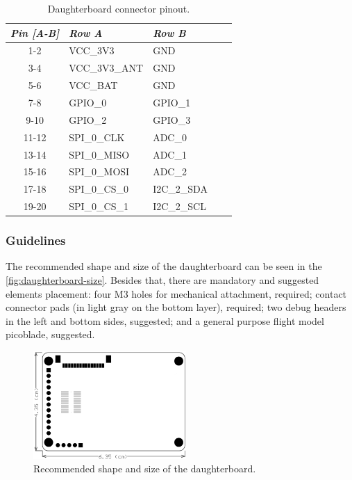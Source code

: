 \begin{table}[!h]
    \centering
    \begin{tabular}{cllll}
        \toprule[1.5pt]
        \textit{Pin [A-B]} & \textit{Row A} & \textit{Row B} \\
        \midrule
        1-2                & VCC\_3V3       & GND            \\
        3-4                & VCC\_3V3\_ANT  & GND            \\
        5-6                & VCC\_BAT       & GND            \\
        7-8                & GPIO\_0        & GPIO\_1        \\
        9-10               & GPIO\_2        & GPIO\_3        \\
        11-12              & SPI\_0\_CLK    & ADC\_0         \\
        13-14              & SPI\_0\_MISO   & ADC\_1         \\
        15-16              & SPI\_0\_MOSI   & ADC\_2         \\
        17-18              & SPI\_0\_CS\_0  & I2C\_2\_SDA    \\
        19-20              & SPI\_0\_CS\_1  & I2C\_2\_SCL    \\
        \bottomrule[1.5pt]
    \end{tabular}
    \caption{Daughterboard connector pinout.}
    \label{tab:daugtherboard-connector-pins}
\end{table}

\subsubsection{Guidelines}

The recommended shape and size of the daughterboard can be seen in the \autoref{fig:daughterboard-size}. Besides that, there are mandatory and suggested elements placement: four M3 holes for mechanical attachment, required; contact connector pads (in light gray on the bottom layer), required; two debug headers in the left and bottom sides, suggested; and a general purpose flight model picoblade, suggested.

\begin{figure}[!ht]
    \begin{center}
        \includegraphics[width=0.52\textwidth]{figures/daughterboard-size.png}
        \caption{Recommended shape and size of the daughterboard.}
        \label{fig:daughterboard-size}
    \end{center}
\end{figure}

